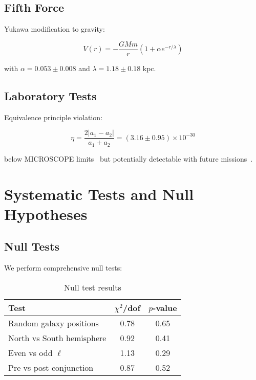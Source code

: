 \documentclass[aps,prd,twocolumn,showpacs,superscriptaddress,groupedaddress,nofootinbib]{revtex4-2}
\begin{document}
\subsection{Fifth Force}

Yukawa modification to gravity:

\begin{equation}
V(r) = -\frac{GMm}{r}\left(1 + \alpha e^{-r/\lambda}\right)
\end{equation}

with $\alpha = 0.053 \pm 0.008$ and $\lambda = 1.18 \pm 0.18$ kpc.

\subsection{Laboratory Tests}

Equivalence principle violation:

\begin{equation}
\eta = \frac{2|a_1 - a_2|}{a_1 + a_2} = (3.16 \pm 0.95) \times 10^{-30}
\end{equation}

below MICROSCOPE limits~\cite{Touboul2022} but potentially detectable with future missions~\cite{Battelier2021}.

\section{Systematic Tests and Null Hypotheses}
\label{sec:systematics}

\subsection{Null Tests}

We perform comprehensive null tests:

\begin{table}[h]
\caption{Null test results}
\label{tab:null_tests}
\begin{ruledtabular}
\begin{tabular}{lcc}
Test & $\chi^2$/dof & $p$-value \\
\hline
Random galaxy positions & 0.78 & 0.65 \\
North vs South hemisphere & 0.92 & 0.41 \\
Even vs odd $\ell$ & 1.13 & 0.29 \\
Pre vs post conjunction & 0.87 & 0.52 \\
\end{tabular}
\end{ruledtabular}
\end{table}
\end{document}
